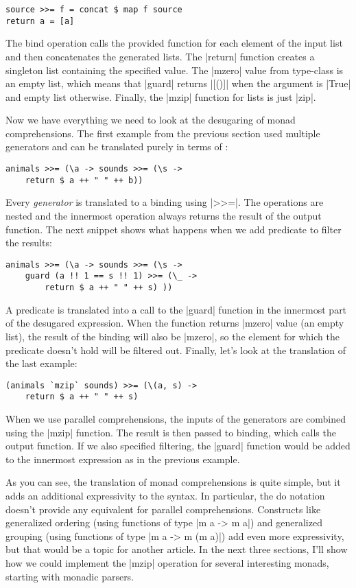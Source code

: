 \documentclass{tmr}
\begin{document}
\begin{verbatim}
source >>= f = concat $ map f source
return a = [a]
\end{verbatim}
The bind operation calls the provided function for each element of the input list and then 
concatenates the generated lists. The |return| function creates a singleton list containing the
specified value. The |mzero| value from  type-class is an empty list, which 
means that |guard| returns |[()]| when the argument is |True| and empty list otherwise. Finally,
the |mzip| function for lists is just |zip|.

Now we have everything we need to look at the desugaring of monad comprehensions. The first
example from the previous section used multiple generators and can be translated purely in terms
of :

\begin{verbatim}
animals >>= (\a -> sounds >>= (\s -> 
    return $ a ++ " " ++ b))
\end{verbatim}
Every \textit{generator} is translated to a binding using |>>=|. The operations are nested and
the innermost operation always returns the result of the output function. The next snippet shows
what happens when we add predicate to filter the results:

\begin{verbatim}
animals >>= (\a -> sounds >>= (\s -> 
    guard (a !! 1 == s !! 1) >>= (\_ -> 
        return $ a ++ " " ++ s) ))
\end{verbatim}
A predicate is translated into a call to the |guard| function in the innermost part of the 
desugared expression. When the function returns |mzero| value (an empty list), the result of the
binding will also be |mzero|, so the element for which the predicate doesn't hold will be 
filtered out. Finally, let's look at the translation of the last example:

\begin{verbatim}
(animals `mzip` sounds) >>= (\(a, s) -> 
    return $ a ++ " " ++ s)
\end{verbatim}
When we use parallel comprehensions, the inputs of the generators are combined using the |mzip|
function. The result is then passed to binding, which calls the output function. If we also 
specified filtering, the |guard| function would be added to the innermost expression as in the 
previous example.

As you can see, the translation of monad comprehensions is quite simple, but it adds an additional
expressivity to the syntax. In particular, the do notation doesn't provide any equivalent for 
parallel comprehensions. Constructs like generalized ordering (using functions of type |m a -> m a|) 
and generalized grouping (using functions of type |m a -> m (m a)|) add even more expressivity, but 
that would be a topic for another article. In the next three sections, I'll show how we could 
implement the |mzip| operation for several interesting monads, starting with monadic parsers.
\end{document}
